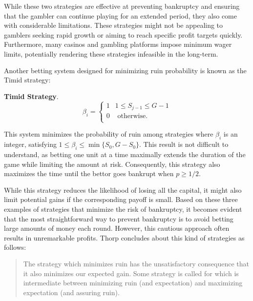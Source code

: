 \documentclass[11pt,twoside]{article}
\numberwithin{Theorem}{section}
\numberwithin{Definition}{section}
\numberwithin{Lemma}{section}
\numberwithin{Algorithm}{section}
\numberwithin{equation}{section}
\begin{document}
While these two strategies are effective at preventing bankruptcy and ensuring that the gambler can continue playing for an extended period, they also come with considerable limitations. These strategies might not be appealing to gamblers seeking rapid growth or aiming to reach specific profit targets quickly. Furthermore, many casinos and gambling platforms impose minimum wager limits, potentially rendering these strategies infeasible in the long-term.

Another betting system designed for minimizing ruin probability is known as the Timid strategy\cite{Thorp, Ross_1974}:
\begin{tcolorbox}[colback=gray!10,boxrule=0.25pt]
\textbf{Timid Strategy}.\\
\begin{equation*} \label{strategy_timid}
\beta_{i} = \left\{
\begin{array}{ll}
1&  1 \leq S_{j-1} \leq G-1\\
0 &  \text{ otherwise}.\\
\end{array}
\right.
\end{equation*}
\end{tcolorbox}

This system minimizes the probability of ruin among strategies where $\beta_{i}$ is an integer, satisfying $1 \leq \beta_{i} \leq \min\{S_{0}, G-S_{0}\}$. This result is not difficult to understand, as betting one unit at a time maximally extends the duration of the game while limiting the amount at risk. Consequently, this strategy also maximizes the time until the bettor goes bankrupt when $p \geq 1/2$.

While this strategy reduces the likelihood of losing all the capital, it might also limit potential gains if the corresponding payoff is small. Based on these three examples of strategies that minimize the risk of bankruptcy, it becomes evident that the most straightforward way to prevent bankruptcy is to avoid betting large amounts of money each round. However, this cautious approach often results in unremarkable profits. Thorp\cite[PP.284]{Thorp} concludes about this kind of strategies as follows:
 \begin{quote} 
{\selectfont
The strategy which minimizes ruin has the unsatisfactory consequence that it also minimizes our expected gain. Some strategy is called for which is intermediate between minimizing ruin (and expectation) and maximizing expectation (and assuring ruin).}
\end{quote}
\end{document}
